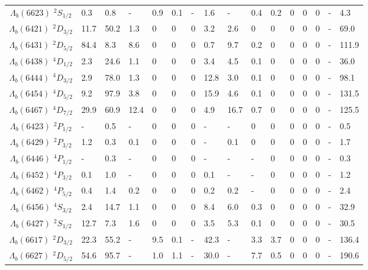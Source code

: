 \begin{tabular}{c |  p{0.58cm}  p{0.58cm}  p{0.58cm}  p{0.58cm}  p{0.58cm}  p{0.58cm}  p{0.58cm}  p{0.58cm}  p{0.58cm}  p{0.58cm}  p{0.58cm}  p{0.58cm}  p{0.58cm}  p{0.58cm}p{0.75cm}}
$\Lambda_b(6623)$ $^{2}S_{1/2}$&0.3   &0.8   &-   &0.9   &0.1   &-   &1.6   &-   &0.4   &0.2   &$0$   &$0$   &$0$   &-   &4.3  \\
$\Lambda_b(6421)$ $^{2}D_{3/2}$&11.7   &50.2   &1.3   &$0$   &$0$   &$0$   &3.2   &2.6   &$0$   &$0$   &$0$   &$0$   &$0$   &-   &69.0  \\
$\Lambda_b(6431)$ $^{2}D_{5/2}$&84.4   &8.3   &8.6   &$0$   &$0$   &$0$   &0.7   &9.7   &0.2   &$0$   &$0$   &$0$   &$0$   &-   &111.9  \\
$\Lambda_b(6438)$ $^{4}D_{1/2}$&2.3   &24.6   &1.1   &$0$   &$0$   &$0$   &3.4   &4.5   &0.1   &$0$   &$0$   &$0$   &$0$   &-   &36.0  \\
$\Lambda_b(6444)$ $^{4}D_{3/2}$&2.9   &78.0   &1.3   &$0$   &$0$   &$0$   &12.8   &3.0   &0.1   &$0$   &$0$   &$0$   &$0$   &-   &98.1  \\
$\Lambda_b(6454)$ $^{4}D_{5/2}$&9.2   &97.9   &3.8   &$0$   &$0$   &$0$   &15.9   &4.6   &0.1   &$0$   &$0$   &$0$   &$0$   &-   &131.5  \\
$\Lambda_b(6467)$ $^{4}D_{7/2}$&29.9   &60.9   &12.4   &$0$   &$0$   &$0$   &4.9   &16.7   &0.7   &$0$   &$0$   &$0$   &$0$   &-   &125.5  \\
$\Lambda_b(6423)$ $^{2}P_{1/2}$&-   &0.5   &-   &$0$   &$0$   &$0$   &-   &-   &$0$   &$0$   &$0$   &$0$   &$0$   &-   &0.5  \\
$\Lambda_b(6429)$ $^{2}P_{3/2}$&1.2   &0.3   &0.1   &$0$   &$0$   &$0$   &-   &0.1   &$0$   &$0$   &$0$   &$0$   &$0$   &-   &1.7  \\
$\Lambda_b(6446)$ $^{4}P_{1/2}$&-   &0.3   &-   &$0$   &$0$   &$0$   &-   &-   &-   &$0$   &$0$   &$0$   &$0$   &-   &0.3  \\
$\Lambda_b(6452)$ $^{4}P_{3/2}$&0.1   &1.0   &-   &$0$   &$0$   &$0$   &0.1   &-   &-   &$0$   &$0$   &$0$   &$0$   &-   &1.2  \\
$\Lambda_b(6462)$ $^{4}P_{5/2}$&0.4   &1.4   &0.2   &$0$   &$0$   &$0$   &0.2   &0.2   &-   &$0$   &$0$   &$0$   &$0$   &-   &2.4  \\
$\Lambda_b(6456)$ $^{4}S_{3/2}$&2.4   &14.7   &1.1   &$0$   &$0$   &$0$   &8.4   &6.0   &0.3   &$0$   &$0$   &$0$   &$0$   &-   &32.9  \\
$\Lambda_b(6427)$ $^{2}S_{1/2}$&12.7   &7.3   &1.6   &$0$   &$0$   &$0$   &3.5   &5.3   &0.1   &$0$   &$0$   &$0$   &$0$   &-   &30.5  \\
$\Lambda_b(6617)$ $^{2}D_{3/2}$&22.3   &55.2   &-   &9.5   &0.1   &-   &42.3   &-   &3.3   &3.7   &$0$   &$0$   &$0$   &-   &136.4  \\
$\Lambda_b(6627)$ $^{2}D_{5/2}$&54.6   &95.7   &-   &1.0   &1.1   &-   &30.0   &-   &7.7   &0.5   &$0$   &$0$   &$0$   &-   &190.6  \\
\hline \hline
\end{tabular}
